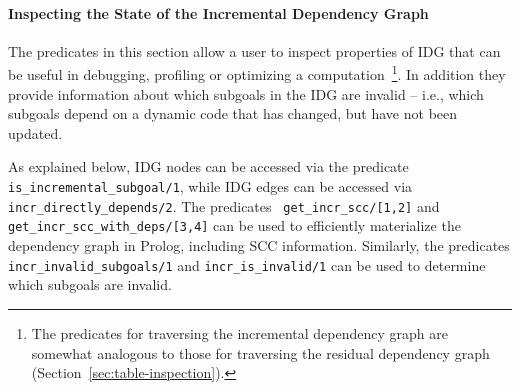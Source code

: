 \paragraph{Inspecting the State of the Incremental Dependency Graph}
%
The predicates in this section allow a user to inspect properties of
IDG that can be useful in debugging, profiling or optimizing a
computation~\footnote{The predicates for traversing the incremental
  dependency graph are somewhat analogous to those for traversing the
  residual dependency graph (Section~\ref{sec:table-inspection}).}.
In addition they provide information about which subgoals in the IDG
are invalid -- i.e., which subgoals depend on a dynamic code that has
changed, but have not been updated.

As explained below, IDG nodes can be accessed via the predicate {\tt
  is\_incremental\_subgoal/1}, while IDG edges can be accessed via
{\tt incr\_directly\_depends/2}.  The predicates {\tt
  get\_incr\_scc/[1,2]} and {\tt get\_incr\_scc\_with\_deps/[3,4]} can
be used to efficiently materialize the dependency graph in Prolog,
including SCC information.  Similarly, the predicates {\tt
  incr\_invalid\_subgoals/1} and {\tt incr\_is\_invalid/1} can be
used to determine which subgoals are invalid.

